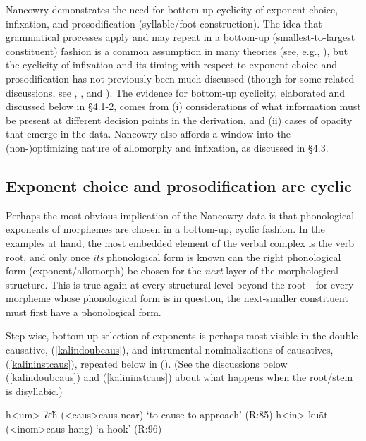 \documentclass[output=paper,colorlinks,citecolor=brown,
]{langscibook}
\newcounter{nexttmp}    %
\newcommand{\Next}{\setcounter{nexttmp}{\value{equation}}\stepcounter{nexttmp}(\thenexttmp)\xspace}
\begin{document}
Nancowry demonstrates the need for bottom-up cyclicity of exponent choice, infixation, and prosodification (syllable/foot construction). The idea that grammatical processes apply and may repeat in a bottom-up (smallest-to-largest constituent) fashion is a common assumption in many theories (see, e.g., \citealt{ChomskyHalle68,Kiparsky82,Kiparsky00,Carstairs87,Anderson92,Bobaljik00,Wolf08,Embick10,BS12}), but the cyclicity of infixation and its timing with respect to exponent choice and prosodification has not previously been  much discussed (though for some related discussions, see  \citealt[\S3.4.3]{Embick10}, \citealt{BF16}, and \citealt{Harizanov17}). The evidence for bottom-up cyclicity, elaborated and discussed below in \S4.1-2, comes from (i) considerations of what information must be present at different decision points in the derivation, and (ii) cases of opacity that emerge in the data. Nancowry also affords a window into the (non-)optimizing nature of allomorphy and infixation, as discussed in \S4.3.

\subsection{Exponent choice and prosodification are cyclic}

Perhaps the most obvious implication of the Nancowry data is that phonological exponents of morphemes are chosen in a bottom-up, cyclic fashion. In the examples at hand, the most embedded element of the verbal complex is the verb root, and only once {\it its} phonological form is known can the right phonological form (exponent/allomorph) be chosen for the {\it next} layer of the morphological structure. This is true again at every structural level beyond the root---for every morpheme whose phonological form is in question, the next-smaller constituent must first have a phonological form. 

Step-wise, bottom-up selection of exponents is perhaps most visible in the double causative, (\ref{kalindoubcaus}), and intrumental nominalizations of causatives, (\ref{kalininstcaus}), repeated below in \Next. (See the  discussions below (\ref{kalindoubcaus}) and  (\ref{kalininstcaus}) about what happens when the root/stem is disyllabic.)

\ea \label{kalin16}
\ea h<um>-ʔ\~εh ({\sc <caus>}{\sc caus-}near) \hfill  `to cause to approach'  (R:85)\label{kalin16a}
\ex h<in>-ku\~at  ({\sc <inom>}{\sc caus-}hang) \hfill `a hook' (R:96) \label{kalin16b}
\z
\z
\end{document}
